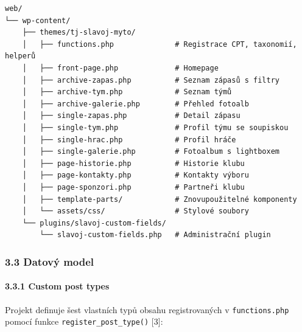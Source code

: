 \begin{verbatim}
web/
└── wp-content/
    ├── themes/tj-slavoj-myto/
    │   ├── functions.php              # Registrace CPT, taxonomií, helperů
    │   ├── front-page.php             # Homepage
    │   ├── archive-zapas.php          # Seznam zápasů s filtry
    │   ├── archive-tym.php            # Seznam týmů
    │   ├── archive-galerie.php        # Přehled fotoalb
    │   ├── single-zapas.php           # Detail zápasu
    │   ├── single-tym.php             # Profil týmu se soupiskou
    │   ├── single-hrac.php            # Profil hráče
    │   ├── single-galerie.php         # Fotoalbum s lightboxem
    │   ├── page-historie.php          # Historie klubu
    │   ├── page-kontakty.php          # Kontakty výboru
    │   ├── page-sponzori.php          # Partneři klubu
    │   ├── template-parts/            # Znovupoužitelné komponenty
    │   └── assets/css/                # Stylové soubory
    └── plugins/slavoj-custom-fields/
        └── slavoj-custom-fields.php   # Administrační plugin
\end{verbatim}

\subsubsection{3.3 Datový model}\label{datovuxfd-model}

\paragraph{3.3.1 Custom post types}\label{custom-post-types}

Projekt definuje šest vlastních typů obsahu registrovaných v
\texttt{functions.php} pomocí funkce \texttt{register\_post\_type()}
{[}3{]}:

